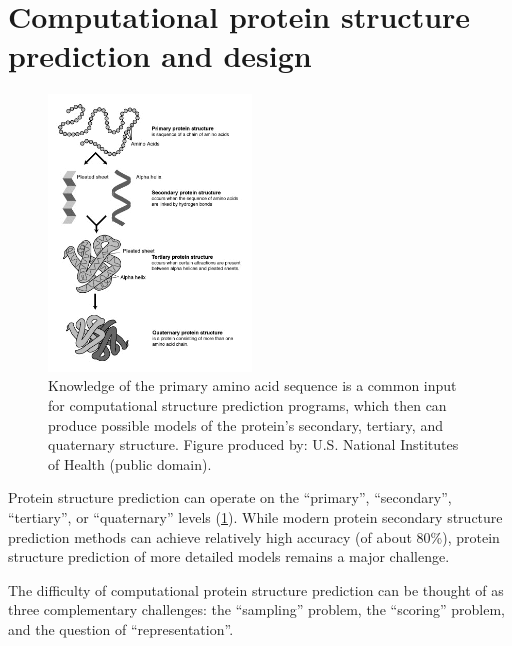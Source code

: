 \section{Computational protein structure prediction and design}

\begin{figure}
  \centering
  \includegraphics[width=0.48\textwidth,keepaspectratio]{figures/protein-structure.png}
  \caption[Protein sequence/structure]{Knowledge of the primary amino acid sequence is a common input for computational structure prediction programs, which then can produce possible models of the protein's secondary, tertiary, and quaternary structure. Figure produced by: U.S. National Institutes of Health (public domain).}
  \label{fig:protein-structure}
  \vspace{-12pt}
\end{figure}

Protein structure prediction can operate on the ``primary'', ``secondary'', ``tertiary'', or ``quaternary'' levels (\cref{fig:protein-structure}).
While modern protein secondary structure prediction methods can achieve relatively high accuracy (of about 80\%\cite{pirovano_protein_2009}), protein structure prediction of more detailed models remains a major challenge.

The difficulty of computational protein structure prediction can be thought of as three complementary challenges: the ``sampling'' problem, the ``scoring'' problem, and the question of ``representation''.

